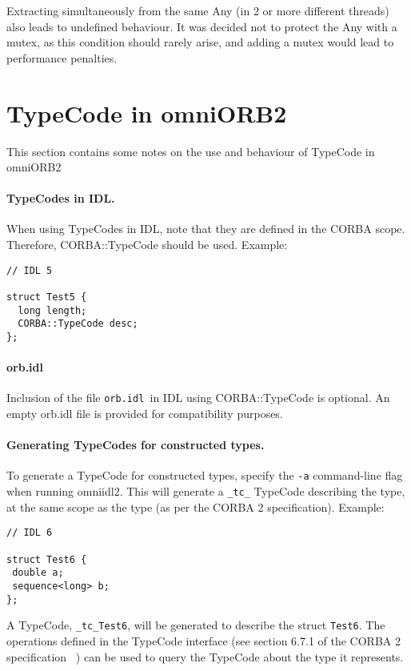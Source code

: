 \documentclass[11pt,twoside,onecolumn]{book}
\begin{document}
Extracting simultaneously from the same Any (in 2 or more different threads)
also leads to undefined behaviour.
It was decided not to protect the Any with a mutex, as this condition
should rarely arise, and adding a mutex would lead to performance penalties.


\section{TypeCode in omniORB2}

This section contains some notes on the use and behaviour of TypeCode in 
omniORB2

\paragraph*{TypeCodes in IDL.}
When using TypeCodes in IDL, note that they are defined in the CORBA scope.
Therefore, CORBA::TypeCode should be used. Example:
{\small
\begin{verbatim}
// IDL 5

struct Test5 {
  long length;
  CORBA::TypeCode desc;
};
\end{verbatim}
}

\paragraph*{orb.idl}
Inclusion of the file {\tt orb.idl }in IDL using CORBA::TypeCode is optional.
An empty orb.idl file is provided for compatibility purposes.

\paragraph*{Generating TypeCodes for constructed types.}
To generate a TypeCode for constructed types, specify the {\tt -a}
command-line flag when running omniidl2. This will generate a {\tt \_tc\_} 
TypeCode describing the type, at the same scope as the type (as per the 
CORBA 2 specification). Example:

{\small
\begin{verbatim}
// IDL 6

struct Test6 {
 double a;
 sequence<long> b;
};
\end{verbatim}
}

A TypeCode, {\tt \_tc\_Test6}, will be generated to describe the struct 
{\tt Test6}. The operations defined in the TypeCode interface (see 
section 6.7.1 of the CORBA 2 specification~\cite{corba2-spec} ) can be used to
query the TypeCode about the type it represents.
\end{document}
